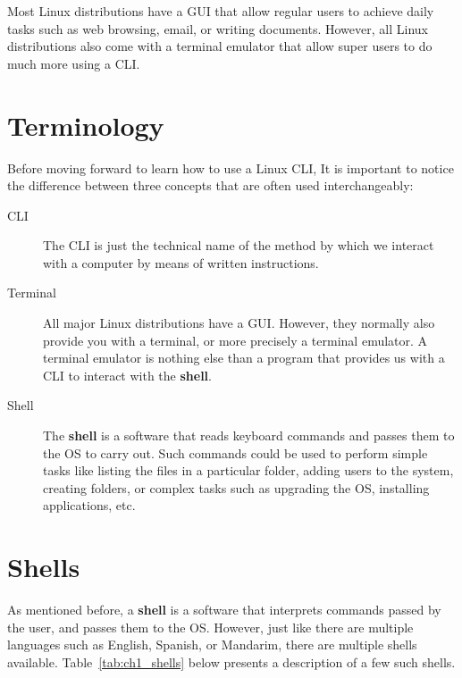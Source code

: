 Most Linux distributions have a \acs{GUI} that allow regular users to achieve daily tasks such as web browsing, email, or writing documents. However, all Linux distributions also come with a terminal emulator that allow super users to do much more using a \acs{CLI}.

\section{Terminology}
\label{sec:ch1_terminology}

Before moving forward to learn how to use a Linux \acs{CLI}, It is important to notice the difference between three concepts that are often used interchangeably:

\begin{description}
\item[CLI] The \acs{CLI} is just the technical name of the method by which we interact with a computer by means of written instructions.
\item[Terminal] All major Linux distributions have a \acs{GUI}. However, they normally also provide you with a terminal, or more precisely a terminal emulator. A terminal emulator is nothing else than a program that provides us with a \acs{CLI} to interact with the \textbf{shell}.
\item[Shell] The \textbf{shell} is a software that reads keyboard commands and passes them to the \acs{OS} to carry out. Such commands could be used to perform simple tasks like listing the files in a particular folder, adding users to the system, creating folders, or complex tasks such as upgrading the \acs{OS}, installing applications, etc.
\end{description}


\section{Shells}
\label{sec:ch1_sells}

As mentioned before, a \textbf{shell} is a software that interprets commands passed by the user, and passes them to the \acs{OS}. However, just like there are multiple languages such as English, Spanish, or Mandarim, there are multiple shells available. Table~\ref{tab:ch1_shells} below presents a description of a few such shells.

